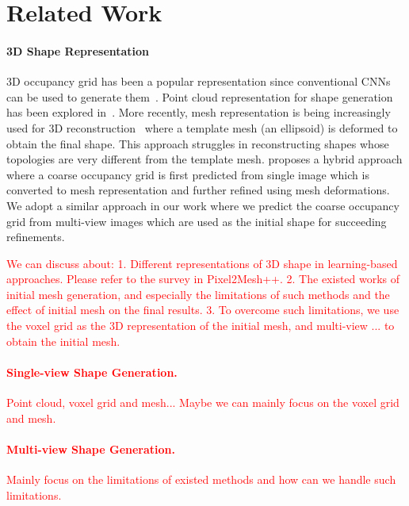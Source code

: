 \section{Related Work}

\paragraph{3D Shape Representation}
3D occupancy grid has been a popular representation since conventional CNNs can be used to generate them~\cite{3dr2n2,kar2017lsm}.
Point cloud representation for shape generation has been explored in~\cite{fan2017point,yang2018foldingnet,jia2020dv}.
More recently, mesh representation is being increasingly used for 3D reconstruction~\cite{wang2018pixel2mesh,wen2019pixel2mesh++} where a template mesh (an ellipsoid) is deformed to obtain the final shape.
This approach struggles in reconstructing shapes whose topologies are very different from the template mesh.
\cite{gkioxari2019meshrcnn} proposes a hybrid approach where a coarse occupancy grid is first predicted from single image which is converted to mesh representation and further refined using mesh deformations.
We adopt a similar approach in our work where we predict the coarse occupancy grid from multi-view images which are used as the initial shape for succeeding refinements.


\textcolor{Red}{
We can discuss about:
1. Different representations of 3D shape in learning-based approaches. Please refer to the survey in Pixel2Mesh++.
2. The existed works of initial mesh generation, and especially the limitations of such methods and the effect of initial mesh on the final results.
3. To overcome such limitations, we use the voxel grid as the 3D representation of the initial mesh, and multi-view ... to obtain the initial mesh.
\paragraph{Single-view Shape Generation.}
Point cloud, voxel grid and mesh... Maybe we can mainly focus on the voxel grid and mesh.
\paragraph{Multi-view Shape Generation.}
Mainly focus on the limitations of existed methods and how can we handle such limitations.
}

